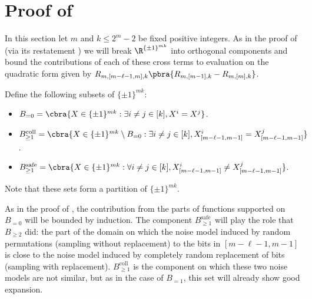 \section{Proof of }\label{sec:nachtergaele hypothesis}


In this section let $m$ and $k\leq 2^m-2$ be fixed positive integers. As in the proof of  (via its restatement ) we will break $\R^{\{\pm1\}^{mk}}$ into orthogonal components and bound the contributions of each of these cross terms to evaluation on the quadratic form given by $R_{m,[m-\ell-1,m],k}\pbra{R_{m,[m-1],k}-R_{m,[m],k}}$. 

Define the following subsets of $\{\pm1\}^{mk}$:
\begin{itemize}
    \item $B_{=0}=\cbra{X\in\{\pm1\}^{mk}:\exists i\neq j\in[k], X^i=X^j}$.\footnotemark{} 
    \item $B_{\geq1}^{\mathrm{coll}}=\cbra{X\in\{\pm1\}^{mk}\setminus B_{=0}:\exists i\neq j\in[k], X^i_{[m-\ell-1,m-1]}=X^j_{[m-\ell-1,m-1]}}$.
    \item $B_{\geq1}^{\mathrm{safe}}=\cbra{X\in\{\pm1\}^{mk}:\forall i\neq j\in[k], X^i_{[m-\ell-1,m-1]}\neq X^j_{[m-\ell-1,m-1]}}$.
\end{itemize}
Note that these sets form a partition of $\{\pm1\}^{mk}$.

As in the proof of , the contribution from the parts of functions supported on $B_{=0}$ will be bounded by induction. The component $B_{\geq1}^{\mathrm{safe}}$ will play the role that $B_{\geq2}$ did: the part of the domain on which the noise model induced by random permutations (sampling without replacement) to the bits in $[m-\ell-1,m-1]$ is close to the noise model induced by completely random replacement of bits (sampling with replacement). $B_{\geq1}^{\mathrm{coll}}$ is the component on which these two noise models are not similar, but as in the case of $B_{=1}$, this set will already show good expansion.


